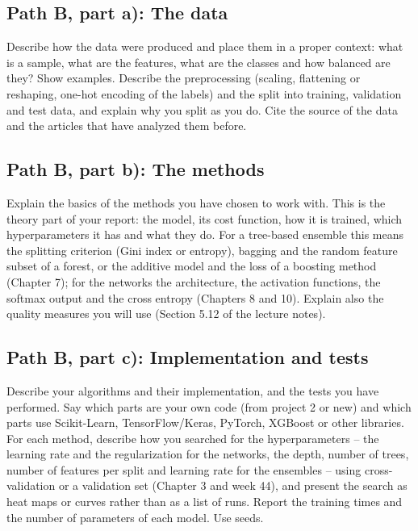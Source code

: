 \documentclass[11pt,a4paper]{article}
\begin{document}
\subsection*{Path B, part a): The data}

Describe how the data were produced and place them in a proper context: what
is a sample, what are the features, what are the classes and how balanced
are they?  Show examples.  Describe the preprocessing (scaling, flattening or
reshaping, one-hot encoding of the labels) and the split into training,
validation and test data, and explain why you split as you do.  Cite the
source of the data and the articles that have analyzed them before.

\subsection*{Path B, part b): The methods}

Explain the basics of the methods you have chosen to work with.  This is the
theory part of your report: the model, its cost function, how it is trained,
which hyperparameters it has and what they do.  For a tree-based ensemble
this means the splitting criterion (Gini index or entropy), bagging and the
random feature subset of a forest, or the additive model and the loss of a
boosting method (Chapter 7); for the networks the architecture, the
activation functions, the softmax output and the cross entropy (Chapters 8
and 10).  Explain also the quality measures you will use (Section 5.12 of the
lecture notes).

\subsection*{Path B, part c): Implementation and tests}

Describe your algorithms and their implementation, and the tests you have
performed.  Say which parts are your own code (from project 2 or new) and
which parts use Scikit-Learn, TensorFlow/Keras, PyTorch, XGBoost or other
libraries.  For each method, describe how you searched for the
hyperparameters -- the learning rate and the regularization for the
networks, the depth, number of trees, number of features per split and
learning rate for the ensembles -- using cross-validation or a validation set
(Chapter 3 and week 44), and present the search as heat maps or curves rather
than as a list of runs.  Report the training times and the number of
parameters of each model.  Use seeds.
\end{document}
